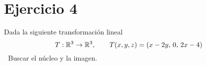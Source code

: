 \section*{Ejercicio 4}

Dada la siguiente transformación lineal
$$ T : \mathbb{R}^{3} \rightarrow \mathbb{R}^{3}, \hspace*{7mm} T(x,y,z) = (x -2y,\, 0,\,2x -4 )$$
\textcolor{white}{.} \hspace{3.3mm} Buscar el núcleo y la imagen.